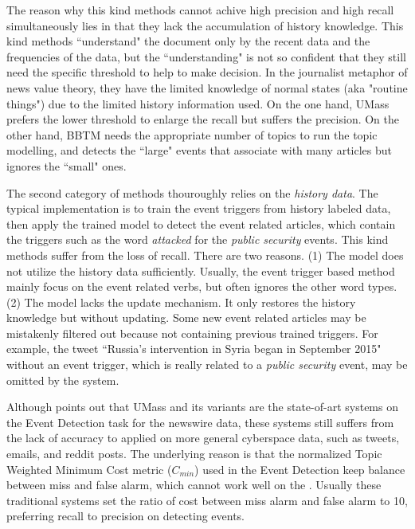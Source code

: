 \documentclass[conference,compsoc]{IEEEtran}
\begin{document}
The reason why this kind methods cannot achive high precision and high recall simultaneously lies in that they lack the accumulation of history knowledge. 
This kind methods ``understand" the document only by the recent data and the frequencies of the data, but the ``understanding" is not so confident that they still need the specific threshold to help to make decision. In the journalist metaphor of news value theory, they have the limited knowledge of normal states (aka "routine things") due to the limited history information used. 
On the one hand, UMass\cite{Allan:2000wu} prefers the lower threshold to enlarge the recall but suffers the precision. 
On the other hand, BBTM needs the appropriate number of topics to run the topic modelling, and detects the ``large" events that associate with many articles but ignores the ``small" ones. 

The second category of methods thouroughly relies on the \textit{history data}. 
The typical implementation is to train the event triggers\cite{Li2013JointEE}\cite{Nguyen2015EventDA} from history labeled data, then apply the trained model to detect the event related articles, which contain the triggers such as the word \textit{attacked} for the \textit{public security} events. 
This kind methods suffer from the loss of recall. 
There are two reasons. 
(1) The model does not utilize the history data sufficiently. 
Usually, the event trigger based method mainly focus on the event related verbs, but often ignores the other word types.
(2) The model lacks the update mechanism. 
It only restores the history knowledge but without updating. 
Some new event related articles may be mistakenly filtered out because not containing previous trained triggers. 
For example, the tweet ``Russia's intervention in Syria began in September 2015" without an event trigger, which is really related to a \textit{public security} event, may be omitted by the system. 



Although \cite{Wurzer:2015wq} points out that UMass\cite{Allan:2000wu} and its variants\cite{Petrovic:2010uj}\cite{petrovic2012using}\cite{Wurzer:2015wq} are the state-of-art systems on the Event Detection task for the newswire data, these systems still suffers from the lack of accuracy to applied on more general cyberspace data, such as tweets, emails, and reddit posts. 
The underlying reason is that the normalized Topic Weighted Minimum Cost metric (\(C_{min}\)) used in the Event Detection keep balance between miss and false alarm, which cannot work well on the .
Usually these traditional systems set the ratio of cost between miss alarm and false alarm to 10, preferring recall to precision on detecting events.
\end{document}
